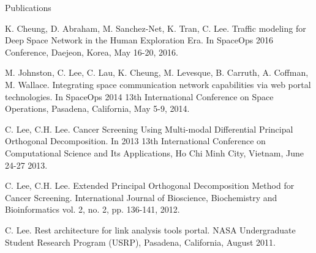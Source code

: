 \documentclass{resume} %
\begin{document}
\begin{rSection}{Publications}
\item K. Cheung, D. Abraham, M. Sanchez-Net, K. Tran, C. Lee. Traffic modeling for Deep Space Network in the Human Exploration Era. In SpaceOps 2016 Conference, Daejeon, Korea, May 16-20, 2016.


\item M. Johnston, C. Lee, C. Lau, K. Cheung, M. Levesque, B. Carruth, A. Coffman, M. Wallace. Integrating space communication network capabilities via web portal technologies. In SpaceOps 2014 13th International Conference on Space Operations, Pasadena, California, May 5-9, 2014. 


\item C. Lee, C.H. Lee. Cancer Screening Using Multi-modal Differential Principal Orthogonal Decomposition. In 2013 13th International Conference on Computational Science and Its Applications, Ho Chi Minh City, Vietnam, June 24-27 2013.

\item C. Lee, C.H. Lee. Extended Principal Orthogonal Decomposition Method for Cancer Screening. International Journal of Bioscience, Biochemistry and Bioinformatics vol. 2, no. 2, pp. 136-141, 2012.

\item C. Lee. Rest architecture for link analysis tools portal. NASA Undergraduate Student Research Program (USRP), Pasadena, California, August 2011. 




\end{rSection}






\end{document}
